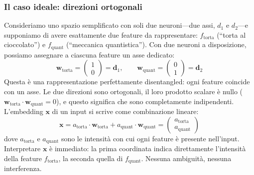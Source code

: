 \subsubsection{Il caso ideale: direzioni ortogonali}
Consideriamo uno spazio semplificato con soli due neuroni—due assi, $d_1$ e $d_2$—e supponiamo di avere esattamente due feature da rappresentare: $f_{\text{torta}}$ (``torta al cioccolato'') e $f_{\text{quant}}$ (``meccanica quantistica''). Con due neuroni a disposizione, possiamo assegnare a ciascuna feature un asse dedicato:
\begin{equation}
    \mathbf{w}_{\text{torta}} = \begin{pmatrix} 1 \\ 0 \end{pmatrix} = \mathbf{d}_1, \qquad
    \mathbf{w}_{\text{quant}} = \begin{pmatrix} 0 \\ 1 \end{pmatrix} = \mathbf{d}_2
\end{equation}
Questa è una rappresentazione perfettamente disentangled: ogni feature coincide con un asse. Le due direzioni sono ortogonali, il loro prodotto scalare è nullo ($\mathbf{w}_{\text{torta}} \cdot \mathbf{w}_{\text{quant}} = 0$), e questo significa che sono completamente indipendenti.
L'embedding $\mathbf{x}$ di un input si scrive come combinazione lineare:
\begin{equation}
    \mathbf{x} = a_{\text{torta}} \cdot \mathbf{w}_{\text{torta}} + a_{\text{quant}} \cdot \mathbf{w}_{\text{quant}} = \begin{pmatrix} a_{\text{torta}} \\ a_{\text{quant}} \end{pmatrix}
\end{equation}
dove $a_{\text{torta}}$ e $a_{\text{quant}}$ sono le intensità con cui ogni feature è presente nell'input.
Interpretare $\mathbf{x}$ è immediato: la prima coordinata indica direttamente l'intensità della feature $f_{\text{torta}}$, la seconda quella di $f_{\text{quant}}$. Nessuna ambiguità, nessuna interferenza.
